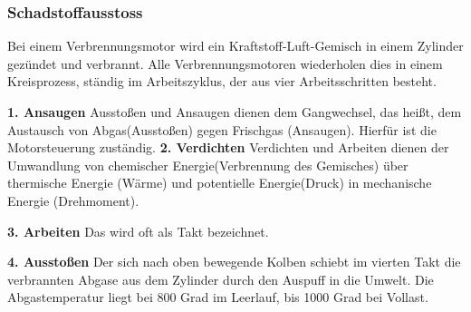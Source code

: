 \subsubsection{Schadstoffausstoss}
\label{subsec:schadstoffausstoss}

Bei einem Verbrennungsmotor wird ein Kraftstoff-Luft-Gemisch in einem Zylinder gezündet und verbrannt.
Alle Verbrennungsmotoren wiederholen dies in einem Kreisprozess, ständig im Arbeitszyklus, der aus vier Arbeitsschritten besteht.

\textbf{1. Ansaugen\newline}
Ausstoßen und Ansaugen dienen dem Gangwechsel, das heißt, dem Austausch von Abgas(Ausstoßen) gegen Frischgas (Ansaugen). Hierfür ist die Motorsteuerung zuständig.
\textbf{2. Verdichten\newline}
Verdichten und Arbeiten dienen der Umwandlung von chemischer Energie(Verbrennung des Gemisches) über thermische Energie (Wärme) und potentielle Energie(Druck) in mechanische Energie (Drehmoment).

\textbf{3. Arbeiten\newline}
Das wird oft als Takt bezeichnet.

\textbf{4. Ausstoßen \newline}
Der sich nach oben bewegende Kolben schiebt im vierten Takt die verbrannten Abgase aus dem Zylinder durch den Auspuff in die Umwelt. 
Die Abgastemperatur liegt bei 800 Grad im Leerlauf, bis 1000 Grad bei Vollast. 
\newline 



\clearpage %